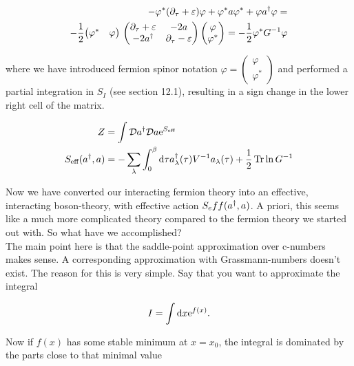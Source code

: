 \begin{align*}
    -\varphi^*(\partial_\tau + \varepsilon)\varphi + \varphi^*a\varphi^* + \varphi a^{\dagger} \varphi = \\  -\frac{1}{2}\begin{matrix}\begin{pmatrix}\varphi^* & \varphi\end{pmatrix}\mbox{}\end{matrix}
  \begin{pmatrix} \partial_\tau + \varepsilon & -2a \\ -2a^{\dagger} & \partial_\tau - \varepsilon \end{pmatrix} 
  \begin{pmatrix} \varphi \\ \varphi^* \end{pmatrix} = -\frac{1}{2}\varphi^* G^{-1}\varphi
\end{align*}

where we have introduced fermion spinor notation $\varphi = \begin{pmatrix} \varphi \\ \varphi^* \end{pmatrix}$ and performed a partial integration in $S_I$ (see section 12.1), resulting in a sign change in the lower right cell of the matrix. 

\begin{align*}
    Z &= \int \mathcal{D} a^{\dagger} \mathcal{D} a \mathrm{e}^{S_{\text{eff}}} \\ 
    S_{\text{eff}}(a^{\dagger}, a) &= -\sum_\lambda \int_{0}^{\beta} \dd \tau a^{\dagger}_\lambda(\tau) V^{-1} a_\lambda(\tau) + \frac{1}{2}\Tr \ln G^{-1} 
\end{align*}

Now we have converted our interacting fermion theory into an effective, interacting boson-theory, with effective action $S_eff(a^{\dagger}, a)$. A priori, this seems like a much more complicated theory compared to the fermion theory we started out with. So what have we accomplished? \\ 

The main point here is that the saddle-point approximation over c-numbers makes sense. A corresponding approximation with Grassmann-numbers doesn't exist. The reason for this is very simple. Say that you want to approximate the integral 

\begin{equation*}
    I = \int \dd x \mathrm{e}^{f(x)}.
\end{equation*}

Now if $f(x)$ has some stable minimum at $x = x_0$, the integral is dominated by the parts close to that minimal value

